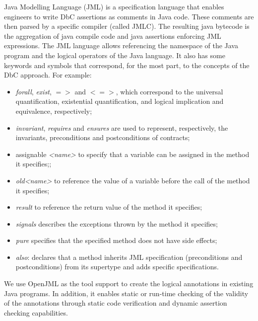 Java Modelling Language (JML) \cite{leavens2006,cok2014} is a specification language  that enables engineers to write DbC assertions as comments in Java code. These comments are then parsed by a specific compiler (called JMLC). The resulting java bytecode is the aggregation of java compile code and java assertions enforcing JML expressions.
The JML language allows referencing the namespace of the Java program and the logical operators of the Java language. It also has some keywords and symbols that correspond, for the most part, to the concepts of the DbC approach. For example:
\begin{itemize}
    \item \textit{forall}, \textit{exist}, $=>$ and $<=>$, which correspond to the universal quantification, existential quantification, and logical implication and equivalence, respectively;
    \item \textit{invariant}, \textit{requires} and \textit{ensures} are used to represent, respectively, the invariants, preconditions and postconditions of contracts;
    \item assignable \textit{<name>} to specify that a variable can be assigned in the method it specifies;;
    \item \textit{old<name>} to reference the value of a variable before the call of the method it specifies;
    \item \textit{result} to reference the return value of the method it specifies;
    \item \textit{signals} describes the exceptions thrown by the method it specifies;
    \item \textit{pure} specifies that the specified method does not have side effects;
    \item \textit{also}: declares that a method inherits JML specification (preconditions and postconditions) from its supertype and adds specific specifications.
\end{itemize}

We use OpenJML \cite{cok2014} as the tool support to create the logical annotations in existing Java programs. In addition, it enables static or run-time checking of the validity of the annotations through static code verification and dynamic assertion checking capabilities.


